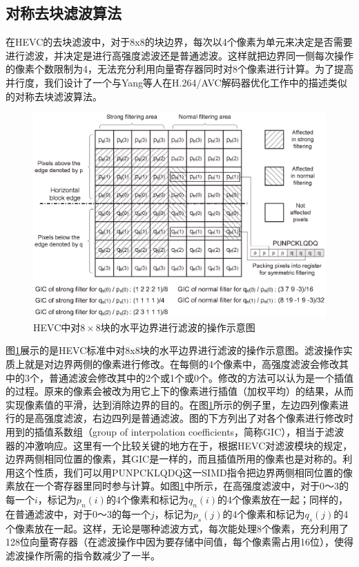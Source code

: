 \subsection{对称去块滤波算法}

在HEVC的去块滤波中，对于8x8的块边界，每次以4个像素为单元来决定是否需要进行滤波，并决定是进行高强度滤波还是普通滤波。这样就把边界同一侧每次操作的像素个数限制为4，无法充分利用向量寄存器同时对8个像素进行计算。为了提高并行度，我们设计了一个与Yang等人在H.264/AVC解码器优化工作\supercite{Yang-TCE2006}中的描述类似的对称去块滤波算法。

\begin{figure}[h]
	\centering
	\includegraphics[width = 1.0\linewidth]{eps/vertical_DF_to_horizontal_edge}
	\caption{\label{fig:vertical_DF_to_horizontal_edge}HEVC中对$8 \times 8$块的水平边界进行滤波的操作示意图}
\end{figure}

图\ref{fig:vertical_DF_to_horizontal_edge}展示的是HEVC标准中对8x8块的水平边界进行滤波的操作示意图。滤波操作实质上就是对边界两侧的像素进行修改。在每侧的4个像素中，高强度滤波会修改其中的3个，普通滤波会修改其中的2个或1个或0个。修改的方法可以认为是一个插值的过程。原来的像素会被改为用它上下的像素进行插值（加权平均）的结果，从而实现像素值的平滑，达到消除边界的目的。在图\ref{fig:vertical_DF_to_horizontal_edge}所示的例子里，左边四列像素进行的是高强度滤波，右边四列是普通滤波。图的下方列出了对各个像素进行修改时用到的插值系数组（group of interpolation coefficients，简称GIC），相当于滤波器的冲激响应\supercite{Norkin-TCSVT2012}。这里有一个比较关键的地方在于，根据HEVC对滤波模块的规定，边界两侧相同位置的像素，其GIC是一样的，而且插值所用的像素也是对称的。利用这个性质，我们可以用PUNPCKLQDQ这一SIMD指令把边界两侧相同位置的像素放在一个寄存器里同时参与计算。如图\ref{fig:vertical_DF_to_horizontal_edge}中所示，在高强度滤波中，对于0～3的每一个$i$，标记为$p_n(i)$的4个像素和标记为$q_n(i)$的4个像素放在一起；同样的，在普通滤波中，对于0～3的每一个$j$，标记为$p_s(j)$的4个像素和标记为$q_s(j)$的4个像素放在一起。这样，无论是哪种滤波方式，每次能处理8个像素，充分利用了128位向量寄存器（在滤波操作中因为要存储中间值，每个像素需占用16位），使得滤波操作所需的指令数减少了一半。

